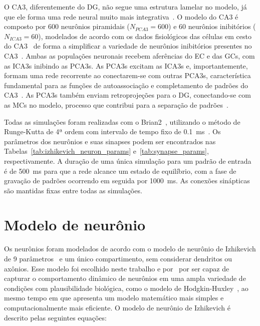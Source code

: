 O CA3, diferentemente do DG, não segue uma estrutura lamelar no modelo, já que ele forma uma rede neural muito mais
integrativa~\cite{pakHippocampal2022, watsonHuman2025}. O modelo do CA3 é composto por 600 neurônios piramidais ($N_{PCA3} = 600$)
e 60 neurônios inibitórios ($N_{ICA3} = 60$), modelados de acordo com os dados fisiológicos das células em cesto do
CA3~\cite{wheelerHippocampomeorg2023} de forma a simplificar a variedade de neurônios inibitórios presentes no
CA3~\cite{kopsickFormation2024}. Ambas as populações neuronais recebem aferências do EC e das GCs, com as ICA3s inibindo as PCA3s.
As PCA3s excitam as ICA3s e, importantemente, formam uma rede recorrente ao conectarem-se com outras PCA3s, característica
fundamental para as funções de autoassociação e completamento de padrões do CA3~\cite{kopsickFormation2024, rollsMechanisms2013}.
As PCA3s também enviam retroprojeções para o DG, conectando-se com as MCs no modelo, processo que contribui para a separação de
padrões~\cite{myersPattern2011}.

Todas as simulações foram realizadas com o Brian2~\cite{stimbergBrian2019a}, utilizando o método de Runge-Kutta de 4ª ordem com
intervalo de tempo fixo de \SI{0.1}{\milli\second}~\cite{butcherHistory1996}. Os parâmetros dos neurônios e suas sinapses podem
ser encontrados nas Tabelas~\ref{tab:izhikevich_neuron_params} e~\ref{tab:synapse_params}, respectivamente. A duração de uma única
simulação para um padrão de entrada é de \SI{500}{\milli\second} para que a rede alcance um estado de equilíbrio, com a fase de
gravação de padrões ocorrendo em seguida por \SI{1000}{\milli\second}. As conexões sinápticas são mantidas fixas entre todas as
simulações.



\section{Modelo de neurônio}

Os neurônios foram modelados de acordo com o modelo de neurônio de Izhikevich de 9
parâmetros~\cite[cap.~8]{izhikevichDynamical2006} e um único compartimento, sem considerar dendritos ou axônios. Esse modelo foi
escolhido neste trabalho e por~ por ser capaz de capturar o comportamento dinâmico de
neurônios em uma ampla variedade de condições com plausibilidade biológica, como o modelo de
Hodgkin-Huxley~\cite{hodgkinQuantitative1952b}, ao mesmo tempo em que apresenta um modelo matemático mais simples e
computacionalmente mais eficiente. O modelo de neurônio de Izhikevich é descrito pelas seguintes equações:


